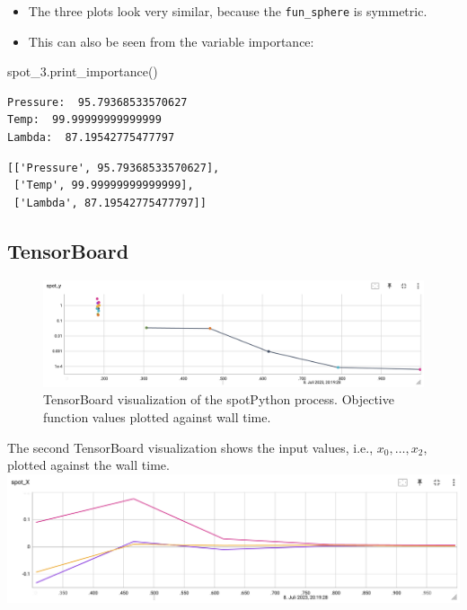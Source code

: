 \documentclass[
  letterpaper,
  DIV=11,
  numbers=noendperiod]{scrreprt}
\newenvironment{Shaded}{\begin{snugshade}}{\end{snugshade}}
\newcommand{\NormalTok}[1]{\textcolor[rgb]{0.00,0.23,0.31}{#1}}
\providecommand{\tightlist}{%
  \setlength{\itemsep}{0pt}\setlength{\parskip}{0pt}}\usepackage{longtable,booktabs,array}
\begin{document}
\begin{itemize}
\tightlist
\item
  The three plots look very similar, because the \texttt{fun\_sphere} is
  symmetric.
\item
  This can also be seen from the variable importance:
\end{itemize}

\begin{Shaded}
\begin{Highlighting}[]
\NormalTok{spot\_3.print\_importance()}
\end{Highlighting}
\end{Shaded}

\begin{verbatim}
Pressure:  95.79368533570627
Temp:  99.99999999999999
Lambda:  87.19542775477797
\end{verbatim}

\begin{verbatim}
[['Pressure', 95.79368533570627],
 ['Temp', 99.99999999999999],
 ['Lambda', 87.19542775477797]]
\end{verbatim}

\subsection{TensorBoard}\label{tensorboard-2}

\begin{figure}[H]

{\centering \includegraphics{figures_static/02_tensorboard_01.png}

}

\caption{TensorBoard visualization of the spotPython process. Objective
function values plotted against wall time.}

\end{figure}%

The second TensorBoard visualization shows the input values, i.e.,
\(x_0, \ldots, x_2\), plotted against the wall time.
\includegraphics{figures_static/02_tensorboard_02.png}
\end{document}
